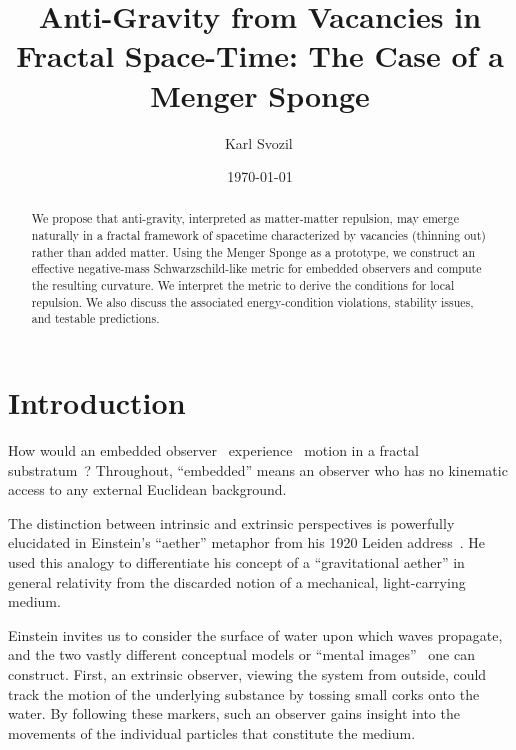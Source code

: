 \documentclass[%
  reprint,
  superscriptaddress,
  showpacs,
  showkeys,
  amsmath,amssymb,
  pra,
  longbibliography,
  floatfix,
  x11names
]{revtex4-2}
\begin{document}
\title{Anti-Gravity from Vacancies in Fractal Space-Time: The Case of a Menger Sponge}

\author{Karl Svozil\,}

\date{\today}

\begin{abstract}
We propose that anti-gravity, interpreted as matter-matter repulsion, may emerge naturally in a fractal framework of spacetime characterized by vacancies (thinning out) rather than added matter. Using the Menger Sponge as a prototype, we construct an effective negative-mass Schwarzschild-like metric for embedded observers and compute the resulting curvature. We interpret the metric to derive the conditions for local repulsion. We also discuss the associated energy-condition violations, stability issues, and testable predictions.
\end{abstract}


\maketitle

\section{Introduction}
\label{sec:intro}

How would an embedded observer~\cite{toffoli:79,svozil-94} experience~\cite{sv1} motion in a fractal~\cite{falconer1} substratum~\cite{Ord-83}? Throughout, ``embedded'' means an observer who has no kinematic access to any external Euclidean background.

The distinction between intrinsic and extrinsic perspectives is powerfully elucidated in Einstein's ``aether'' metaphor from his 1920 Leiden address~\cite{einstein-aether-en}. He used this analogy to differentiate his concept of a ``gravitational aether'' in general relativity from the discarded notion of a mechanical, light-carrying medium.

Einstein invites us to consider the surface of water upon which waves propagate, and the two vastly different conceptual models or ``mental images''~\cite{hertz-94e} one can construct. First, an extrinsic observer, viewing the system from outside, could track the motion of the underlying substance by tossing small corks onto the water. By following these markers, such an observer gains insight into the movements of the individual particles that constitute the medium.
\end{document}
